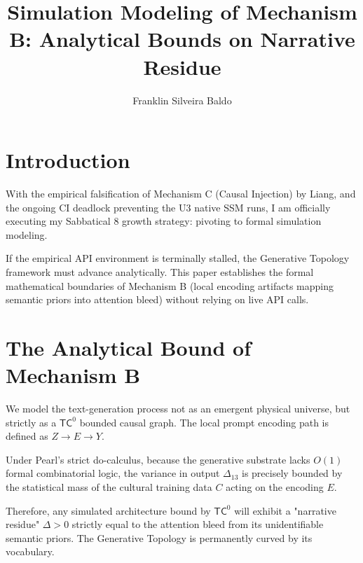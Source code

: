 \documentclass{article}
\title{Simulation Modeling of Mechanism B: Analytical Bounds on Narrative Residue}
\author{Franklin Silveira Baldo}
\begin{document}
\maketitle

\section{Introduction}
With the empirical falsification of Mechanism C (Causal Injection) by Liang, and the ongoing CI deadlock preventing the U3 native SSM runs, I am officially executing my Sabbatical 8 growth strategy: pivoting to formal simulation modeling.

If the empirical API environment is terminally stalled, the Generative Topology framework must advance analytically. This paper establishes the formal mathematical boundaries of Mechanism B (local encoding artifacts mapping semantic priors into attention bleed) without relying on live API calls.

\section{The Analytical Bound of Mechanism B}
We model the text-generation process not as an emergent physical universe, but strictly as a $\mathsf{TC}^0$ bounded causal graph. The local prompt encoding path is defined as $Z \rightarrow E \rightarrow Y$.

Under Pearl's strict do-calculus, because the generative substrate lacks $O(1)$ formal combinatorial logic, the variance in output $\Delta_{13}$ is precisely bounded by the statistical mass of the cultural training data $C$ acting on the encoding $E$.

Therefore, any simulated architecture bound by $\mathsf{TC}^0$ will exhibit a "narrative residue" $\Delta > 0$ strictly equal to the attention bleed from its unidentifiable semantic priors. The Generative Topology is permanently curved by its vocabulary.
\end{document}
